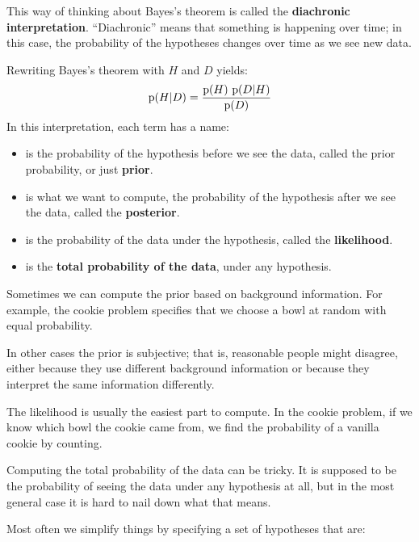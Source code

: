 \documentclass[12pt]{book}
\theoremstyle{exercise}
\begin{document}

This way of thinking about Bayes's theorem is called the
{\bf diachronic interpretation}.  ``Diachronic'' means that something
is happening over time; in this case, the probability of the hypotheses changes over time as we see new data.

Rewriting Bayes's theorem with $H$ and $D$ yields:
%
\[ \mathrm{p}(H|D) = \frac{\mathrm{p}(H)~\mathrm{p}(D|H)}{\mathrm{p}(D)} \]
%
In this interpretation, each term has a name:


\begin{itemize}

\item {} is the probability of the hypothesis before we see
the data, called the prior probability, or just {\bf prior}.

\item {} is what we want to compute, the probability of
the hypothesis after we see the data, called the {\bf posterior}.
 
\item {} is the probability of the data under the hypothesis,
called the {\bf likelihood}.

\item {} is the {\bf total probability of the data}, under any hypothesis.

\end{itemize}

Sometimes we can compute the prior based on background information.  For example, the cookie problem specifies that we choose a bowl at random with equal probability.

In other cases the prior is subjective; that is, reasonable people
might disagree, either because they use different background
information or because they interpret the same information
differently.


The likelihood is usually the easiest part to compute.  In the
cookie problem, if we know which bowl the cookie came from,
we find the probability of a vanilla cookie by counting.

Computing the total probability of the data can be tricky.  It is supposed to be the probability of seeing the data under any hypothesis at all, but in the most general case it is hard to nail down what that means.

Most often we simplify things by specifying a set of hypotheses
that are:
\end{document}
